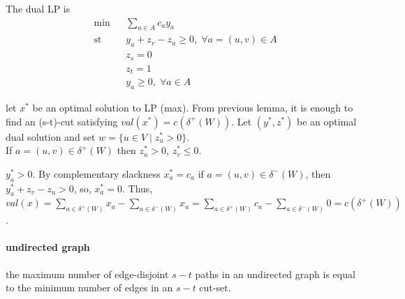 \documentclass[main]{subfiles}
\begin{document}
The dual LP is 
\begin{equation*}
\begin{aligned}
& \min & & \sum_{a \in A} c_a y_a\\
& \text{st} & & y_a + z_v - z_u \geq 0, \; \forall a = (u,v) \in A \\
& & & z_s = 0 \\
& & & z_t = 1 \\
& & & y_a \geq 0, \; \forall a \in A
\end{aligned}
\end{equation*}

let $x^*$ be an optimal solution to LP (max). From previous lemma, it is enough
to find an (s-t)-cut satisfying $val(x^*) = c(\delta^+(W))$. Let $(y^*, z^*)$
be an optimal dual solution and set $w = \{ u \in V \mid z_u^* > 0\}$.\\
If $a=(u,v) \in \delta^+(W)$ then $z_u^* > 0$, $z_v^* \leq 0$.

$y^*_a > 0$. By complementary slackness $x^*_a = c_a$ if $a =(u,v) \in \delta^-
(W)$, then $y^*_a + z_v - z_u > 0$, so, $x^*_a = 0$. Thus, $val(x) = \sum_{a
\in \delta^+(W)} x_a - \sum_{a \in \delta^-(W)} x_a = \sum_{a \in \delta^+(W)}
c_a - \sum_{a \in \delta^-(W)} 0 = c(\delta^+(W))$.

\paragraph{undirected graph}
the maximum number of edge-disjoint $s-t$ paths in an undirected graph is
equal to the minimum number of edges in an $s-t$ cut-set.
\end{document}
